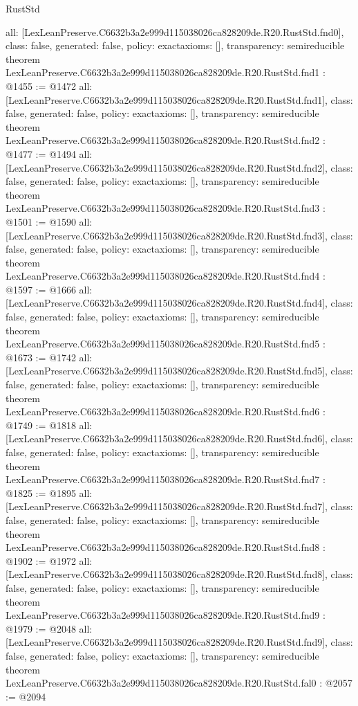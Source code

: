 \begin{lexlean}{RustStd}
\begin{coremodule}
{  all: [LexLeanPreserve.C6632b3a2e999d115038026ca828209de.R20.RustStd.fnd0],
  class: false,
  generated: false,
  policy: exact{axioms: []},
  transparency: semireducible
}
theorem LexLeanPreserve.C6632b3a2e999d115038026ca828209de.R20.RustStd.fnd1 : @1455 := @1472 {
  all: [LexLeanPreserve.C6632b3a2e999d115038026ca828209de.R20.RustStd.fnd1],
  class: false,
  generated: false,
  policy: exact{axioms: []},
  transparency: semireducible
}
theorem LexLeanPreserve.C6632b3a2e999d115038026ca828209de.R20.RustStd.fnd2 : @1477 := @1494 {
  all: [LexLeanPreserve.C6632b3a2e999d115038026ca828209de.R20.RustStd.fnd2],
  class: false,
  generated: false,
  policy: exact{axioms: []},
  transparency: semireducible
}
theorem LexLeanPreserve.C6632b3a2e999d115038026ca828209de.R20.RustStd.fnd3 : @1501 := @1590 {
  all: [LexLeanPreserve.C6632b3a2e999d115038026ca828209de.R20.RustStd.fnd3],
  class: false,
  generated: false,
  policy: exact{axioms: []},
  transparency: semireducible
}
theorem LexLeanPreserve.C6632b3a2e999d115038026ca828209de.R20.RustStd.fnd4 : @1597 := @1666 {
  all: [LexLeanPreserve.C6632b3a2e999d115038026ca828209de.R20.RustStd.fnd4],
  class: false,
  generated: false,
  policy: exact{axioms: []},
  transparency: semireducible
}
theorem LexLeanPreserve.C6632b3a2e999d115038026ca828209de.R20.RustStd.fnd5 : @1673 := @1742 {
  all: [LexLeanPreserve.C6632b3a2e999d115038026ca828209de.R20.RustStd.fnd5],
  class: false,
  generated: false,
  policy: exact{axioms: []},
  transparency: semireducible
}
theorem LexLeanPreserve.C6632b3a2e999d115038026ca828209de.R20.RustStd.fnd6 : @1749 := @1818 {
  all: [LexLeanPreserve.C6632b3a2e999d115038026ca828209de.R20.RustStd.fnd6],
  class: false,
  generated: false,
  policy: exact{axioms: []},
  transparency: semireducible
}
theorem LexLeanPreserve.C6632b3a2e999d115038026ca828209de.R20.RustStd.fnd7 : @1825 := @1895 {
  all: [LexLeanPreserve.C6632b3a2e999d115038026ca828209de.R20.RustStd.fnd7],
  class: false,
  generated: false,
  policy: exact{axioms: []},
  transparency: semireducible
}
theorem LexLeanPreserve.C6632b3a2e999d115038026ca828209de.R20.RustStd.fnd8 : @1902 := @1972 {
  all: [LexLeanPreserve.C6632b3a2e999d115038026ca828209de.R20.RustStd.fnd8],
  class: false,
  generated: false,
  policy: exact{axioms: []},
  transparency: semireducible
}
theorem LexLeanPreserve.C6632b3a2e999d115038026ca828209de.R20.RustStd.fnd9 : @1979 := @2048 {
  all: [LexLeanPreserve.C6632b3a2e999d115038026ca828209de.R20.RustStd.fnd9],
  class: false,
  generated: false,
  policy: exact{axioms: []},
  transparency: semireducible
}
theorem LexLeanPreserve.C6632b3a2e999d115038026ca828209de.R20.RustStd.fal0 : @2057 := @2094 {
}
\end{coremodule}
\end{lexlean}
